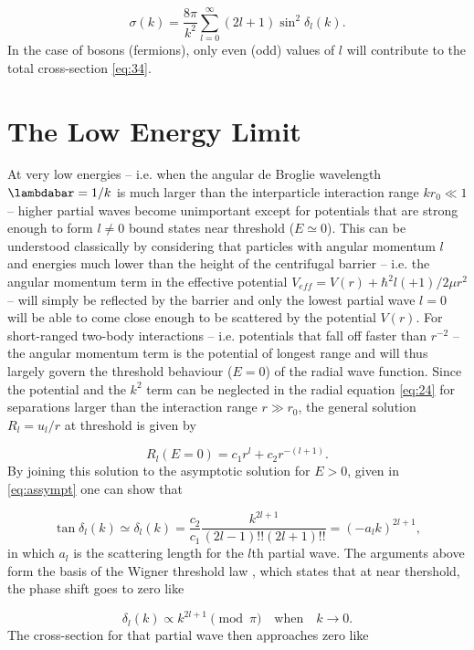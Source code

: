 \begin{equation}\label{eq:34}
\sigma(k)=
\frac{8\pi}{k^2}\sum_{l=0}^{\infty} (2l+1)\sin^2\delta_l(k). 
\end{equation}
In the case of bosons (fermions), only even (odd) values of $l$ will contribute to the total cross-section \eqref{eq:34}.

\section{The Low Energy Limit}
At very low energies --  i.e. when the angular de Broglie wavelength $\lambdabar = 1/k$ is much larger than the interparticle interaction range $kr_0 \ll 1$ -- higher partial waves become unimportant except for potentials that are strong enough to form $l\neq 0$ bound states near threshold ($E \simeq 0$). This can be understood classically by considering that particles with angular momentum $l$ and energies much lower than the height of the centrifugal barrier -- i.e. the angular momentum term in the effective potential $V_{eff} = V(r) + \hbar^2l(+1)/2\mu r^2$ -- will simply be reflected by the barrier and only the lowest partial wave $l=0$ will be able to come close enough to be scattered by the potential $V(r)$. For short-ranged two-body interactions -- i.e. potentials that fall off faster than $r^{-2}$ -- the angular momentum term is the potential of longest range and will thus largely govern the threshold behaviour ($E=0$) of the radial wave function. Since the potential and the $k^2$ term can be neglected in the radial equation \eqref{eq:24} for separations larger than the interaction range $r \gg r_0$, the general solution $R_l = u_l/r$ at threshold is given by

\begin{equation}\label{eq:35}
R_l(E=0) = c_1r^l + c_2r^{-(l+1)}.
\end{equation}
By joining this solution to the asymptotic solution for $E>0$, given in \eqref{eq:assympt} one can show that

\begin{equation}
\tan\delta_l(k) \simeq \delta_l(k) = \frac{c_2}{c_1}\frac{k^{2l+1}}{(2l-1)!!(2l+1)!!} = (-a_lk)^{2l+1},
\end{equation}
in which $a_l$ is the scattering length for the $l$th partial wave. The arguments above form the basis of the Wigner threshold law \cite{Landau1965Quantum,Sadeghpour_2000}, which states that at near thershold, the phase shift goes to zero like

\begin{equation}
\delta_l(k) \propto k^{2l+1} \pmod{\pi} \quad \text{when} \quad k \rightarrow 0.
\end{equation}
The cross-section for that partial wave then approaches zero like

